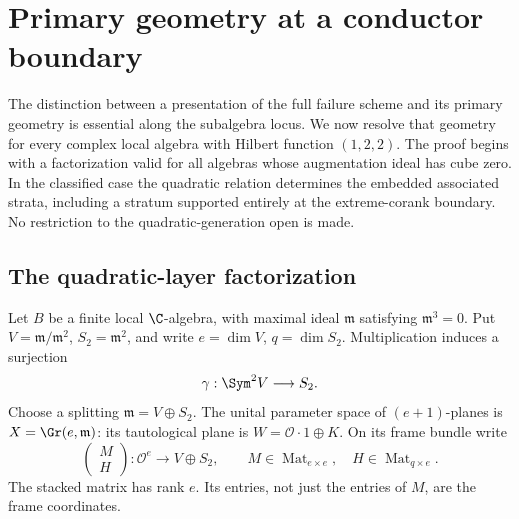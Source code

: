 \section{Primary geometry at a conductor boundary}
\label{sec:loewy-boundary}
The distinction between a presentation of the full failure scheme and
its primary geometry is essential along the subalgebra locus. We now
resolve that geometry for every complex local algebra with Hilbert
function $(1,2,2)$. The proof begins with a factorization valid for all
algebras whose augmentation ideal has cube zero. In the classified
case the quadratic relation determines the embedded associated strata,
including a stratum supported entirely at the extreme-corank boundary.
No restriction to the quadratic-generation open is made.

\subsection{The quadratic-layer factorization}
Let $B$ be a finite local $\C$-algebra, with maximal ideal
$\mathfrak m$ satisfying $\mathfrak m^3=0$. Put
$V=\mathfrak m/\mathfrak m^2$, $S_2=\mathfrak m^2$, and write
$e=\dim V$, $q=\dim S_2$. Multiplication induces a surjection
\[
 \gamma:\Sym^2V\longrightarrow S_2.
\]
Choose a splitting $\mathfrak m=V\oplus S_2$. The unital parameter
space of $(e+1)$-planes is $X=\Gr(e,\mathfrak m)$: its tautological
plane is $W=\mathcal O\cdot1\oplus K$. On its frame bundle write
\begin{equation}\label{eq:loewy-frame}
 \begin{pmatrix}M\\H\end{pmatrix}:\mathcal O^e\longrightarrow
             V\oplus S_2,
 \qquad M\in\operatorname{Mat}_{e\times e},\quad
 H\in\operatorname{Mat}_{q\times e}.
\end{equation}
The stacked matrix has rank $e$. Its entries, not just the entries
of $M$, are the frame coordinates.

